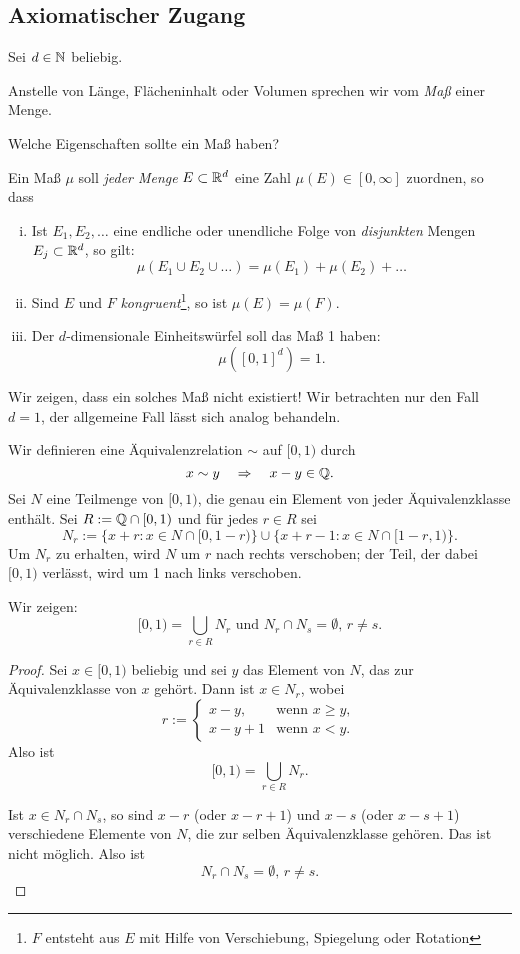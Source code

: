 \documentclass[
 a4paper,
 12pt,
 parskip=half
 ]{scrreprt}
\theoremstyle{plain}
\theoremstyle{definition}
\numberwithin{equation}{section}
\begin{document}
\subsection*{Axiomatischer Zugang}
Sei $d \in \mathbb{N}$ beliebig. 

Anstelle von Länge, Flächeninhalt oder Volumen sprechen wir vom \emph{Maß} einer Menge.

Welche Eigenschaften sollte ein Maß haben?

Ein Maß $\mu$ soll \emph{jeder Menge} $E \subset \mathbb{R}^d$ eine Zahl $\mu(E) \in [0, \infty]$ zuordnen, so dass
\begin{enumerate}[(i)]
 \item Ist $E_1, E_2, \ldots$ eine endliche oder unendliche Folge von \emph{disjunkten} Mengen $E_j \subset \mathbb{R}^d$, so gilt:
 \[ \mu(E_1 \cup E_2 \cup \ldots ) = \mu(E_1) + \mu(E_2) + \ldots \]
 \item Sind $E$ und $F$ \emph{kongruent}\footnote{$F$ entsteht aus $E$ mit Hilfe von Verschiebung, Spiegelung oder Rotation}, so ist $\mu(E) = \mu(F)$.
 \item Der $d$-dimensionale Einheitswürfel soll das Maß 1 haben:
  \[ \mu([0,1]^d) = 1. \]
\end{enumerate}

Wir zeigen, dass ein solches Maß nicht existiert! Wir betrachten nur den Fall $d=1$, der allgemeine Fall lässt sich analog behandeln.

Wir definieren eine Äquivalenzrelation $\sim$ auf $[0,1)$ durch
\[ x \sim y \quad \Rightarrow \quad x-y \in \mathbb{Q}. \]
Sei $N$ eine Teilmenge von $[0,1)$, die genau ein Element von jeder Äquivalenzklasse enthält. Sei $R := \mathbb{Q} \cap [0,1)$ und für jedes $r \in R$ sei 
\[ N_r := \{ x + r: x \in N \cap [0,1-r) \} \cup \{ x + r - 1: x \in N \cap [1-r,1) \}. \]
Um $N_r$ zu erhalten, wird $N$ um $r$ nach rechts verschoben; der Teil, der dabei $[0,1)$ verlässt, wird um 1 nach links verschoben.

Wir zeigen:
\[ [0,1) = \bigcup_{r \in R} N_r \text{ und } N_r \cap N_s = \emptyset,\, r \ne s. \]

\begin{proof}
 Sei $x \in [0,1)$ beliebig und sei $y$ das Element von $N$, das zur Äquivalenzklasse von $x$ gehört. Dann ist $x \in N_r$, wobei 
 \[ r := \begin{cases}
          x-y, & \text{wenn } x \ge y, \\
          x-y+1 & \text{wenn } x < y.
         \end{cases} \]
 Also ist
 \[ [0,1) = \bigcup_{r \in R} N_r. \]
 
 Ist $x \in N_r \cap N_s$, so sind $x-r$ (oder $x-r+1$) und $x-s$ (oder $x-s+1$) verschiedene Elemente von $N$, die zur selben Äquivalenzklasse gehören. Das ist nicht möglich. Also ist
 \[ N_r \cap N_s = \emptyset,\, r \ne s. \]
\end{proof}
\end{document}
